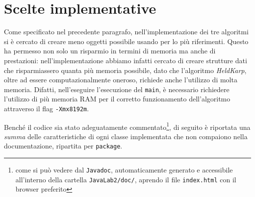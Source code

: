 \section{Scelte implementative}
Come specificato nel precedente paragrafo, nell'implementazione dei tre algoritmi si è cercato di creare meno oggetti possibile usando per lo più riferimenti. Questo ha permesso non solo un risparmio in termini di memoria ma anche di prestazioni: nell'implementazione abbiamo infatti cercato di creare strutture dati che risparmiassero quanta più memoria possibile, dato che l'algoritmo \textit{HeldKarp}, oltre ad essere computazionalmente oneroso, richiede anche l'utilizzo di molta memoria. Difatti, nell'eseguire l'esecuzione del \texttt{main}, è necessario richiedere l'utilizzo di più memoria RAM per il corretto funzionamento dell'algoritmo attraverso il flag \texttt{-Xmx8192m}.

Benché il codice sia stato adeguatamente commentato\footnote{come si può vedere dal \texttt{Javadoc}, automaticamente generato e accessibile all'interno della cartella \texttt{JavaLab2/doc/}, aprendo il file \texttt{index.html} con il browser preferito}, di seguito è riportata una \emph{summa} delle caratteristiche di ogni classe implementata che non compaiono nella documentazione, ripartita per \texttt{package}.

